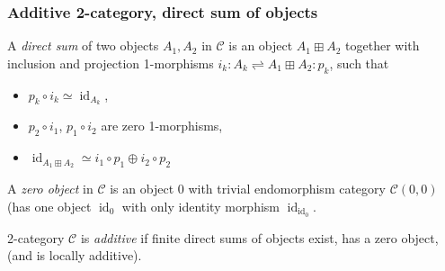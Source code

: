\documentclass{beamer}
\DeclareMathOperator{\id}{id}
\newcommand{\cC}{{\mathcal{C}}}
\begin{document}
\begin{frame}
\frametitle{Additive 2-category, direct sum of objects}

\pause

\begin{definition}
A \emph{direct sum} of two objects $A_1,A_2$ in $\cC$
is an object $A_1 \boxplus A_2$ together with
inclusion and projection 1-morphisms
$i_k : A_k \rightleftharpoons A_1 \boxplus A_2 : p_k$,
such that
\begin{itemize}
\item $p_k \circ i_k \simeq \id_{A_k}$,
\item $p_2 \circ i_1$, $p_1 \circ i_2$ are zero 1-morphisms,
\item $\id_{A_1 \boxplus A_2} \simeq
	i_1 \circ p_1 \oplus i_2 \circ p_2$
\end{itemize}
\end{definition}

\pause

\begin{definition}
A \emph{zero object} in $\cC$
is an object $0$ with trivial endomorphism category
$\cC(0,0)$ (has one object $\id_0$
with only identity morphism $\id_{\id_0}$.
\end{definition}

\pause

\begin{definition}
2-category $\cC$ is \emph{additive}
if finite direct sums of objects exist,
has a zero object,
(and is locally additive).
\end{definition}


\end{frame}
\end{document}
